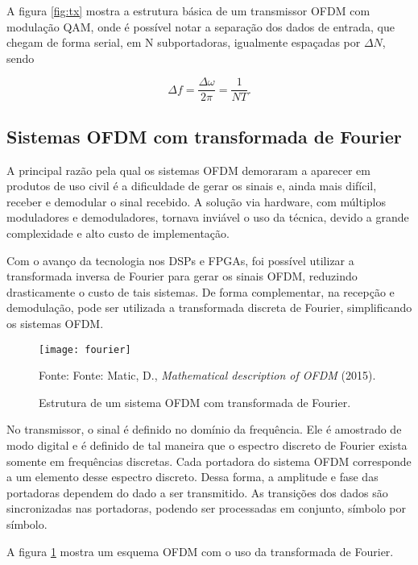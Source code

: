 A figura \ref{fig:tx} mostra a estrutura básica de um transmissor OFDM com modulação QAM, onde é possível notar a separação dos dados de entrada, que chegam de forma serial, em N subportadoras, igualmente espaçadas por $\Delta N$, sendo

\begin{equation}
\Delta f = \frac{\Delta \omega}{2 \pi} = \frac{1}{NT}.
\end{equation}

\subsection{Sistemas OFDM com transformada de Fourier}
A principal razão pela qual os sistemas OFDM demoraram a aparecer em produtos de uso civil é a dificuldade de gerar os sinais e, ainda mais difícil, receber e demodular o sinal recebido. A solução via hardware, com múltiplos moduladores e demoduladores, tornava inviável o uso da técnica, devido a grande complexidade e alto custo de implementação.

Com o avanço da tecnologia nos DSPs e FPGAs, foi possível utilizar a transformada inversa de Fourier para gerar os sinais OFDM, reduzindo drasticamente o custo de tais sistemas. De forma complementar, na recepção e demodulação, pode ser utilizada a transformada discreta de Fourier, simplificando os sistemas OFDM.

\begin{figure}[H]
  \centering
  \caption{Estrutura de um sistema OFDM com transformada de Fourier.}
  \label{fig:fourier}
  \texttt{[image: fourier]}
  
  \small Fonte: Fonte: Matic, D., \textit{Mathematical description of OFDM} (2015).
\end{figure}

No transmissor, o sinal é definido no domínio da frequência. Ele é amostrado de modo digital e é definido de tal maneira que o espectro discreto de Fourier exista somente em frequências discretas. Cada portadora do sistema OFDM corresponde a um elemento desse espectro discreto. Dessa forma, a amplitude e fase das portadoras dependem do dado a ser transmitido. As transições dos dados são sincronizadas nas portadoras, podendo ser processadas em conjunto, símbolo por símbolo.

A figura \ref{fig:fourier} mostra um esquema OFDM com o uso da transformada de Fourier.

